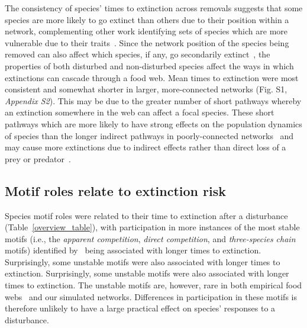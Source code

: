 \documentclass[12pt]{article}
\begin{document}
\begin{spacing}{2.0}
		The consistency of species' times to extinction across removals suggests that some species are more likely to go extinct than others due to their position within a network, complementing other work identifying sets of species which are more vulnerable due to their traits~\citep{Curtsdotter2011,Ryser2019}. 
		Since the network position of the species being removed can also affect which species, if any, go secondarily extinct~\citep{Wootton2016a,Dunne2002}, the properties of both disturbed and non-disturbed species affect the ways in which extinctions can cascade through a food web.
        Mean times to extinction were most consistent and somewhat shorter in larger, more-connected networks (Fig. S1, \emph{Appendix S2}).
        This may be due to the greater number of short pathways whereby an extinction somewhere in the web can affect a focal species.
        These short pathways which are more likely to have strong effects on the population dynamics of species than the longer indirect pathways in poorly-connected networks~\citep{Jordan2002,Jordan2006} and may cause more extinctions due to indirect effects rather than direct loss of a prey or predator~\citet{Wootton2016a}. 


	\subsection*{Motif roles relate to extinction risk}

		Species motif roles were related to their time to extinction after a disturbance (Table~\ref{overview_table}), with participation in more instances of the most stable motifs (i.e., the \emph{apparent competition}, \emph{direct competition}, and \emph{three-species chain} motifs) identified by~\citet{Stouffer2007,Borrelli2015a} being associated with longer times to extinction. 
		Surprisingly, some unstable motifs were also associated with longer times to extinction.
        Surprisingly, some unstable motifs were also associated with longer times to extinction.
		The unstable motifs are, however, rare in both empirical food webs~\citep{Stouffer2007} and our simulated networks.
		Differences in participation in these motifs is therefore unlikely to have a large practical effect on species' responses to a disturbance.
        

\end{spacing}
\end{document}
